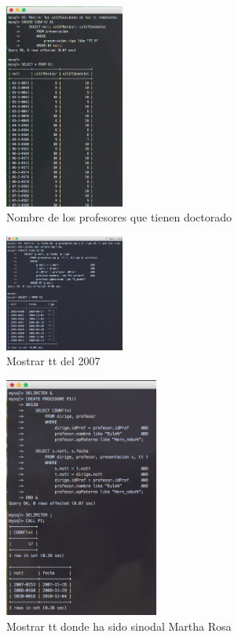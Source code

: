 \documentclass[12pt, fleqn]{article}                             %
\begin{document}
        \begin{figure}[ht!]
            \centering
            \includegraphics[width=0.35\textwidth]{BD6Reporte4}
            \caption{Nombre de los profesores que tienen doctorado}
        \end{figure}

        \begin{figure}[ht!]
            \centering
            \includegraphics[width=0.35\textwidth]{BD6Reporte5}
            \caption{Mostrar tt del 2007}
        \end{figure}

        \begin{figure}[ht!]
            \centering
            \includegraphics[width=0.45\textwidth]{BD6Reporte6}
            \caption{Mostrar tt donde ha sido sinodal Martha Rosa}
        \end{figure}
\end{document}
